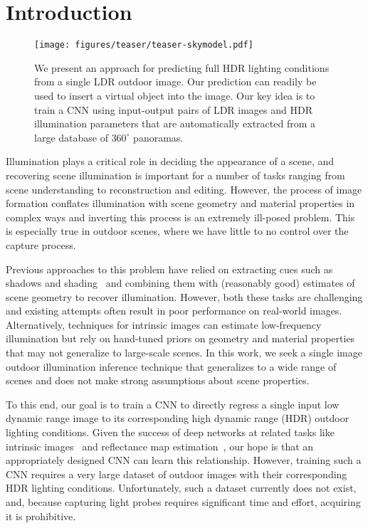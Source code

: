 \section{Introduction}

\begin{figure}
\centering
\texttt{[image: figures/teaser/teaser-skymodel.pdf]}
\caption[Presentation of the proposed method]{We present an approach for predicting full HDR lighting conditions from a single LDR outdoor image. Our prediction can readily be used to insert a virtual object into the image. Our key idea is to train a CNN using input-output pairs of LDR images and HDR illumination parameters that are automatically extracted from a large database of $360^\circ$ panoramas.}
\label{fig:teaser}
\vspace{-1em}
\end{figure}

Illumination plays a critical role in deciding the appearance of a scene, and recovering scene illumination is important for a number of tasks ranging from scene understanding to reconstruction and editing. However, the process of image formation conflates illumination with scene geometry and material properties in complex ways and inverting this process is an extremely ill-posed problem. This is especially true in outdoor scenes, where we have little to no control over the capture process.

Previous approaches to this problem have relied on extracting cues such as shadows and shading~\cite{lalonde-ijcv-12} and combining them with (reasonably good) estimates of scene geometry to recover illumination. However, both these tasks are challenging and existing attempts often result in poor performance on real-world images. Alternatively, techniques for intrinsic images can estimate low-frequency illumination but rely on hand-tuned priors on geometry and material properties~\cite{barron-pami-15,lombardi2016reflectance} that may not generalize to large-scale scenes. In this work, we seek a single image outdoor illumination inference technique that generalizes to a wide range of scenes and does not make strong assumptions about scene properties.

To this end, our goal is to train a CNN to directly regress a single input low dynamic range image to its corresponding high dynamic range (HDR) outdoor lighting conditions. Given the success of deep networks at related tasks like intrinsic images~\cite{zhou2015intrinsic} and reflectance map estimation~\cite{rematas-cvpr-16}, our hope is that an appropriately designed CNN can learn this relationship. However, training such a CNN requires a very large dataset of outdoor images with their corresponding HDR lighting conditions. Unfortunately, such a dataset currently does not exist, and, because capturing light probes requires significant time and effort, acquiring it is prohibitive.

